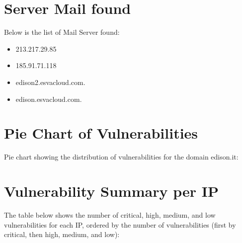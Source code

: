 \documentclass{article}
\begin{document}
\clearpage

\section{Server Mail found}

Below is the list of Mail Server found:

\begin{itemize}
    
        
            \item 213.217.29.85
        
            \item 185.91.71.118
        
            \item edison2.esvacloud.com.
        
            \item edison.esvacloud.com.
        
    
\end{itemize}

\clearpage

\section{Pie Chart of Vulnerabilities}

\noindent Pie chart showing the distribution of vulnerabilities for the domain \ttfamily edison.it:


\begin{figure}[H]
    \centering
\end{figure}


\clearpage

\section{Vulnerability Summary per IP}

\noindent The table below shows the number of critical, high, medium, and low vulnerabilities for each IP, ordered by the number of vulnerabilities (first by critical, then high, medium, and low):
\end{document}
